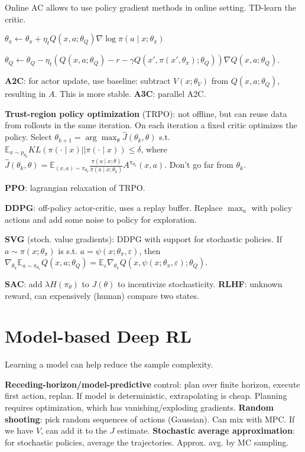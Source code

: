 \documentclass[11pt,landscape,a4paper,fleqn]{article}
\begin{document}
\begin{multicols*}{4}
Online AC allows to use policy gradient methods in online setting.
TD-learn the critic.

\(\theta_\pi \leftarrow \theta_\pi + \eta_t Q(x, a; \theta_Q) \nabla \log \pi(a \mid x; \theta_\pi)\)

\(\theta_Q \leftarrow \theta_Q - \eta_t(Q(x, a; \theta_Q) - r - \gamma Q(x', \pi(x', \theta_\pi); \theta_Q)) \nabla Q(x, a; \theta_Q)\).

\textbf{A2C}: for actor update, use baseline: subtract \(V(x; \theta_V)\) from \(Q(x, a; \theta_Q)\), resulting in \(A\).
This is more stable. \textbf{A3C}: parallel A2C.

\textbf{Trust-region policy optimization} (TRPO):
not offline, but can reuse data from rollouts in the same iteration.
On each iteration a fixed critic optimizes the policy.
Select \(\theta_{k+1} = \arg\max_\theta \hat{J}(\theta_k, \theta)\) s.t.
\(\mathbb{E}_{x \sim p_{\theta_k}} KL(\pi(\cdot \mid x) || \pi(\cdot \mid x)) \leq \delta\),
where \(\hat{J}(\theta_k, \theta) = \mathbb{E}_{(x, a) \sim \pi_{\theta_k}} \frac{\pi(a \mid x; \theta)}{\pi(a \mid x; \theta_k)} A^{\pi_{\theta_k}}(x, a)\).
Don't go far from \(\theta_k\).

\textbf{PPO}: lagrangian relaxation of TRPO.

\textbf{DDPG}: off-policy actor-critic, uses a replay buffer.
Replace \(\max_a\) with policy actions and add some noise to policy for exploration.

\textbf{SVG} (stoch. value gradients): DDPG with support for stochastic policies.
If \(a \sim \pi(x; \theta_\pi)\) is s.t. \(a = \psi(x; \theta_\pi, \varepsilon)\),
then \(\nabla_{\theta_\pi} \mathbb{E}_{a \sim \pi_{\theta_\pi}} Q(x, a; \theta_Q) =
\mathbb{E}_{\varepsilon} \nabla_{\theta_\pi} Q(x, \psi(x; \theta_\pi, \varepsilon); \theta_Q)\).

\textbf{SAC}: add \(\lambda H(\pi_\theta)\) to \(J(\theta)\) to incentivize stochasticity.
\textbf{RLHF}: unknown reward, can expensively (human) compare two states.

\section{Model-based Deep RL}

Learning a model can help reduce the sample complexity.

\textbf{Receding-horizon/model-predictive} control:
plan over finite horizon, execute first action, replan.
If model is deterministic, extrapolating is cheap.
Planning requires optimization, which has vanishing/exploding gradients.
\textbf{Random shooting}: pick random sequences of actions (Gaussian).
Can mix with MPC.
If we have \(V\), can add it to the \(J\) estimate.
\textbf{Stochastic average approximation}: for stochastic policies,
average the trajectories. Approx. avg. by MC sampling.


\end{multicols*}
\end{document}
